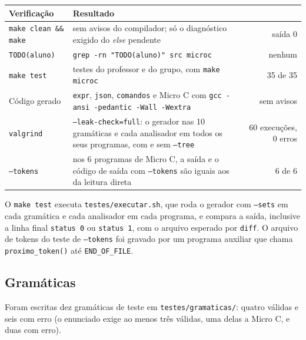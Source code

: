 \documentclass[11pt,a4paper]{article}
\begin{document}
\begin{center}
\small
\begin{tabular}{@{}lp{7.6cm}r@{}}
\toprule
Verificação & Resultado & \\
\midrule
\texttt{make clean \&\& make} & sem avisos do compilador; só o diagnóstico exigido do \emph{else} pendente & saída 0 \\
\texttt{TODO(aluno)} & \texttt{grep -rn "TODO(aluno)" src microc} & nenhum \\
\texttt{make test} & testes do professor e do grupo, com \texttt{make microc} & 35 de 35 \\
Código gerado & \texttt{expr}, \texttt{json}, \texttt{comandos} e Micro C com \texttt{gcc -ansi -pedantic -Wall -Wextra} & sem avisos \\
\texttt{valgrind} & \texttt{--leak-check=full}: o gerador nas 10 gramáticas e cada analisador em todos os seus programas, com e sem \texttt{--tree} & 60 execuções, 0 erros \\
\texttt{--tokens} & nos 6 programas de Micro C, a saída e o código de saída com \texttt{--tokens} são iguais aos da leitura direta & 6 de 6 \\
\bottomrule
\end{tabular}
\end{center}

O \texttt{make test} executa \texttt{testes/executar.sh}, que roda o gerador com \texttt{--sets}
em cada gramática e cada analisador em cada programa, e compara a saída, inclusive a linha final
\texttt{status 0} ou \texttt{status 1}, com o arquivo esperado por \texttt{diff}. O arquivo de
tokens do teste de \texttt{--tokens} foi gravado por um programa auxiliar que chama
\texttt{proximo\_token()} até \texttt{END\_OF\_FILE}.

\subsection{Gramáticas}

Foram escritas dez gramáticas de teste em \texttt{testes/gramaticas/}: quatro válidas e seis com
erro (o enunciado exige ao menos três válidas, uma delas a Micro C, e duas com erro).
\end{document}

